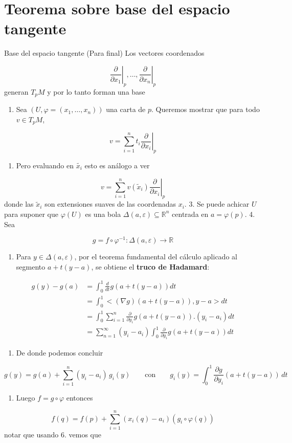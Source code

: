 \section{Teorema sobre base del espacio tangente}
\begin{booktheorem}{Base del espacio tangente (Para final)}
Los vectores coordenados

\[
\left.\frac{\partial}{\partial x_1}\right|_p,\dots,\left.\frac{\partial}{\partial x_n}\right|_p
\]
generan $T_pM$ y por lo tanto forman una base

\end{booktheorem}
\begin{bookproof}{}
\begin{enumerate}
\item Sea $(U,\varphi=(x_1,\dots,x_n))$ una carta de $p$. Queremos mostrar que para todo $v\in T_pM$,
\end{enumerate}
\[
v=\sum_{i=1}^n t_{i}\left.\frac{\partial}{\partial x_i}\right|_p
\]
\begin{enumerate}[start=2]
\item Pero evaluando en $\tilde{x_{i}}$ esto es análogo a ver
\end{enumerate}
\[
v=\sum_{i=1}^n v(\widetilde{x}_i)\left.\frac{\partial}{\partial x_i}\right|_p
\]
donde las $\widetilde{x}_i$ son extensiones suaves de las coordenadas $x_i$. 3. Se puede achicar $U$ para suponer que $\varphi(U)$ es una bola $\Delta(a,\varepsilon)\subseteq\mathbb{R}^n$ centrada en $a=\varphi(p)$. 4. Sea

\[
g=f\circ\varphi^{-1}:\Delta(a,\varepsilon)\to\mathbb{R}
\]
\begin{enumerate}[start=5]
\item Para $y\in\Delta(a,\varepsilon)$, por el teorema fundamental del cálculo aplicado al segmento $a+t(y-a)$, se obtiene el \textbf{truco de Hadamard}:
\end{enumerate}
\[
\begin{aligned}g(y)-g(a)&=\int_{0}^{1} \frac{d}{dt}g(a+t(y-a))dt\\&=\int_{0}^{1} <(\nabla g)(a+t(y-a)),y-a>dt\\&=\int_{0}^{1} \sum^{n}_{i=1} \frac{\partial}{\partial y_{i}}g(a+t(y-a)).(y_{i}-a_{i})dt\\&=\sum^{\infty}_{n=1}(y_{i}-a_{i})\int_{0}^{1} \frac{\partial}{\partial y_{i}}g(a+t(y-a))dt\end{aligned}
\]
\begin{enumerate}[start=6]
\item De donde podemos concluir
\end{enumerate}
\[
g(y)=g(a)+\sum_{i=1}^n (y_i-a_i)\,g_i(y)\qquad \text{con}\qquad g_i(y)=\int_0^1 \frac{\partial g}{\partial y_i}(a+t(y-a))\,dt
\]
\begin{enumerate}[start=7]
\item Luego $f=g\circ\varphi$ entonces
\end{enumerate}
\[
f(q)=f(p)+\sum^{n}_{i=1} (x_{i}(q)-a_{i})(g_{i}\circ\varphi(q))
\]
notar que usando 6. vemos que


\end{bookproof}
